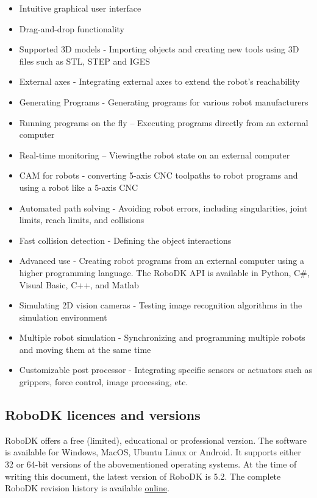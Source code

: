 \begin{itemize}
\item Intuitive graphical user interface
\item Drag-and-drop functionality 
\item Supported 3D models - Importing objects and creating new tools using 3D files such as STL, STEP and IGES
\item External axes - Integrating external axes to extend the robot’s reachability
\item Generating Programs - Generating programs for various robot manufacturers
\item Running programs on the fly – Executing programs directly from an external computer
\item Real-time monitoring – Viewingthe robot state on an external computer 
\item CAM for robots - converting 5-axis CNC toolpaths to robot programs and using a robot like a 5-axis CNC
\item Automated path solving - Avoiding robot errors, including singularities, joint limits, reach limits, and collisions
\item Fast collision detection - Defining the object interactions 
\item Advanced use - Creating robot programs from an external computer using a higher programming language. The RoboDK API is available in Python, C#, Visual Basic, C++, and Matlab
\item Simulating 2D vision cameras - Testing image recognition algorithms in the simulation environment
\item Multiple robot simulation - Synchronizing and programming multiple robots and moving them at the same time 
\item Customizable post processor - Integrating specific sensors or actuators such as grippers, force control, image processing, etc.
\end{itemize}

\subsection{RoboDK licences and versions}

RoboDK offers a free (limited), educational or professional version. 
The software is available for Windows, MacOS, Ubuntu Linux or Android. It supports either 32 or 64-bit versions of the abovementioned operating systems. At the time of writing this document, the latest version of RoboDK is 5.2. The complete RoboDK revision history is available \href{https://robodk.com/whatsnew}{online}. 

